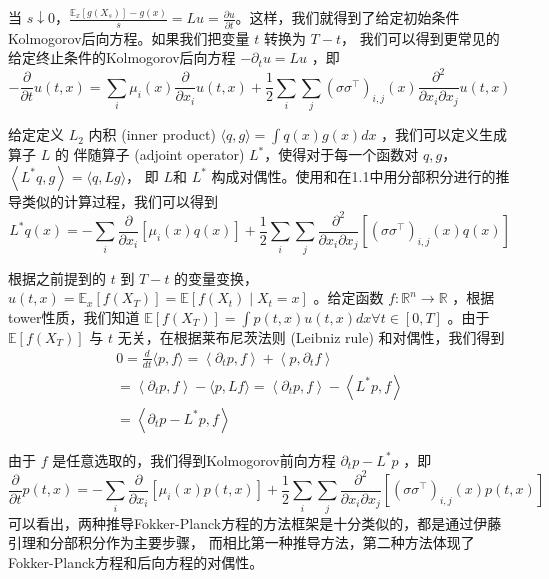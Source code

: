 当 $s \downarrow 0$，$\frac{\mathbb{E}_x\left[g\left(X_s\right)\right]-g(x)}{s}=L u=\frac{\partial u}{\partial t}$。这样，我们就得到了给定初始条件Kolmogorov后向方程。如果我们把变量 $t$ 转换为 $T-t$，
我们可以得到更常见的给定终止条件的Kolmogorov后向方程 $-\partial_t u=L u$ ，即
$$
-\frac{\partial}{\partial t} u(t, x)=\sum_i \mu_i(x) \frac{\partial}{\partial x_i} u(t, x)+\frac{1}{2} \sum_i \sum_j\left(\sigma \sigma^{\top}\right)_{i, j}(x) \frac{\partial^2}{\partial x_i \partial x_j} u(t, x)
$$

给定定义 $L_2$ 内积 (inner product) $\langle q, g\rangle=\int q(x) g(x) d x$ ，我们可以定义生成算子 $L$ 的
伴随算子 (adjoint operator) $L^*$，使得对于每一个函数对 $q,g$，$\left\langle L^* q, g\right\rangle=\langle q, L g\rangle$，
即 $L$和 $L^*$ 构成对偶性。使用和在1.1中用分部积分进行的推导类似的计算过程，我们可以得到
$$
L^* q(x)=-\sum_i \frac{\partial}{\partial x_i}\left[\mu_i(x) q(x)\right]+\frac{1}{2} \sum_i \sum_j \frac{\partial^2}{\partial x_i \partial x_j}\left[\left(\sigma \sigma^{\top}\right)_{i, j}(x) q(x)\right]
$$

根据之前提到的 $t$ 到 $T-t$ 的变量变换， $u(t, x)=\mathbb{E}_x\left[f\left(X_T\right)\right]=\mathbb{E}\left[f\left(X_t\right) \mid X_t=x\right]$ 。给定函数 $f: \mathbb{R}^n \rightarrow \mathbb{R}$ ，根据tower性质，我们知道 $\mathbb{E}\left[f\left(X_T\right)\right]=\int p(t, x) u(t, x) d x \forall t \in[0, T]$ 。由于 $\mathbb{E}\left[f\left(X_T\right)\right]$ 与 $t$ 无关，在根据莱布尼茨法则 (Leibniz rule) 和对偶性，我们得到
$$
\begin{gathered}
0=\frac{d}{d t}\langle p, f\rangle=\left\langle\partial_t p, f\right\rangle+\left\langle p, \partial_t f\right\rangle \\
=\left\langle\partial_t p, f\right\rangle-\langle p, L f\rangle=\left\langle\partial_t p, f\right\rangle-\left\langle L^* p, f\right\rangle \\
=\left\langle\partial_t p-L^* p, f\right\rangle
\end{gathered}
$$

由于 $f$ 是任意选取的，我们得到Kolmogorov前向方程 $\partial_t p-L^* p$ ，即
$$
\frac{\partial}{\partial t} p(t, x)=-\sum_i \frac{\partial}{\partial x_i}\left[\mu_i(x) p(t, x)\right]+
\frac{1}{2} \sum_i \sum_j \frac{\partial^2}{\partial x_i \partial x_j}
\left[\left(\sigma \sigma^{\top}\right)_{i, j}(x) p(t, x)\right]
$$
可以看出，两种推导Fokker-Planck方程的方法框架是十分类似的，都是通过伊藤引理和分部积分作为主要步骤，
而相比第一种推导方法，第二种方法体现了Fokker-Planck方程和后向方程的对偶性。

